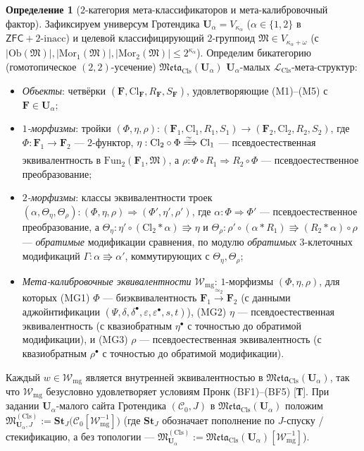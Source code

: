\documentclass[11pt]{article}
\theoremstyle{plain}
\theoremstyle{definition}
\newtheorem{definition}[theorem]{Определение}
\newcommand{\cC}{\mathcal{C}}
\newcommand{\fM}{\mathfrak{M}}
\newcommand{\Meta}{\mathfrak{Meta}}
\newcommand{\LCls}{\mathcal{L}_{\mathrm{Cls}}}
\newcommand{\Ob}{\mathrm{Ob}}
\newcommand{\Mor}{\mathrm{Mor}}
\newcommand{\Fun}{\mathrm{Fun}}
\newcommand{\Cl}{\mathrm{Cl}}
\newcommand{\ZFC}{\mathsf{ZFC}}
\begin{document}
\begin{definition}[$2$-категория мета-классификаторов и мета-калибровочный фактор]\label{def:meta-gauge-quotient}
Зафиксируем универсум Гротендика $\mathbf{U}_\alpha = V_{\kappa_\alpha}$ ($\alpha \in \{1, 2\}$ в $\ZFC + 2\text{-inacc}$) и целевой классифицирующий $2$-группоид $\fM \in V_{\kappa_\alpha + \omega}$ (с $|\Ob(\fM)|, |\Mor_1(\fM)|, |\Mor_2(\fM)| \le 2^{\kappa_\alpha}$). Определим бикатегорию (гомотопическое $(2,2)$-усечение) $\Meta_{\mathrm{Cls}}(\mathbf{U}_\alpha)$ $\mathbf{U}_\alpha$-малых $\LCls$-мета-структур:
\begin{itemize}[nosep]
\item \emph{Объекты}: четвёрки $(\mathbf{F}, \Cl_{\mathbf{F}}, R_{\mathbf{F}}, S_{\mathbf{F}})$, удовлетворяющие \textup{(M1)--(M5)} с $\mathbf{F} \in \mathbf{U}_\alpha$;
\item \emph{$1$-морфизмы}: тройки $(\Phi, \eta, \rho) : (\mathbf{F}_1, \Cl_1, R_1, S_1) \to (\mathbf{F}_2, \Cl_2, R_2, S_2)$, где $\Phi : \mathbf{F}_1 \to \mathbf{F}_2$ — $2$-функтор, $\eta : \Cl_2 \circ \Phi \xRightarrow{\simeq} \Cl_1$ — псевдоестественная эквивалентность в $\Fun_2(\mathbf{F}_1, \fM)$, а $\rho : \Phi \circ R_1 \Rightarrow R_2 \circ \Phi$ — псевдоестественное преобразование;
\item \emph{$2$-морфизмы}: классы эквивалентности троек $(\alpha, \Theta_\eta, \Theta_\rho) : (\Phi, \eta, \rho) \Rightarrow (\Phi', \eta', \rho')$, где $\alpha : \Phi \Rightarrow \Phi'$ — псевдоестественное преобразование, а $\Theta_\eta : \eta' \circ (\Cl_2 * \alpha) \Rrightarrow \eta$ и $\Theta_\rho : \rho' \circ (\alpha * R_1) \Rrightarrow (R_2 * \alpha) \circ \rho$ — \emph{обратимые} модификации сравнения, по модулю \emph{обратимых} $3$-клеточных модификаций $\Gamma : \alpha \Rrightarrow \alpha'$, коммутирующих с $\Theta_\eta, \Theta_\rho$;
\item \emph{Мета-калибровочные эквивалентности $\mathcal{W}_{\mathrm{mg}}$}: $1$-морфизмы $(\Phi, \eta, \rho)$, для которых \textup{(MG1)} $\Phi$ — биэквивалентность $\mathbf{F}_1 \xrightarrow{\simeq_2} \mathbf{F}_2$ (с данными аджойнтификации $(\Psi, \delta, \delta^\bullet, \varepsilon, \varepsilon^\bullet, s, t)$), \textup{(MG2)} $\eta$ — псевдоестественная эквивалентность (с квазиобратным $\eta^\bullet$ с точностью до обратимой модификации), и \textup{(MG3)} $\rho$ — псевдоестественная эквивалентность (с квазиобратным $\rho^\bullet$ с точностью до обратимой модификации).
\end{itemize}
Каждый $w \in \mathcal{W}_{\mathrm{mg}}$ является внутренней эквивалентностью в $\Meta_{\mathrm{Cls}}(\mathbf{U}_\alpha)$, так что $\mathcal{W}_{\mathrm{mg}}$ безусловно удовлетворяет условиям Пронк \textup{(BF1)--(BF5)} \textup{[\textbf{Т}]}. При задании $\mathbf{U}_\alpha$-малого сайта Гротендика $(\cC_0, J)$ в $\Meta_{\mathrm{Cls}}(\mathbf{U}_\alpha)$ положим $\fM^{(\mathrm{Cls})}_{\mathbf{U}_\alpha, J} := \mathbf{St}_J\bigl(\cC_0[\mathcal{W}_{\mathrm{mg}}^{-1}]\bigr)$ (где $\mathbf{St}_J$ обозначает пополнение по $J$-спуску / стекификацию, а без топологии — $\fM^{(\mathrm{Cls})}_{\mathbf{U}_\alpha} := \Meta_{\mathrm{Cls}}(\mathbf{U}_\alpha)[\mathcal{W}_{\mathrm{mg}}^{-1}]$).
\end{definition}
\end{document}
